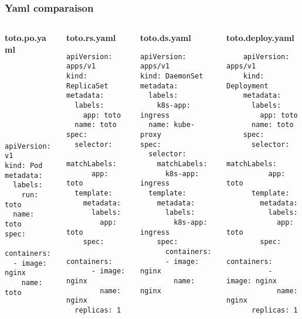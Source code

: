 \subsubsection{Yaml comparaison}
\begin{frame}[fragile]{\subsubsecname}

\begin{small}
\begin{columns}
  \begin{column}{0.20\linewidth}
    \textbf{toto.po.yaml}
    \begin{lstlisting}








apiVersion: v1
kind: Pod
metadata:
  labels:
    run: toto
  name: toto
spec:
  containers:
  - image: nginx
    name: toto
    \end{lstlisting}
  \end{column}
  \begin{column}{0.27\linewidth}
    \textbf{toto.rs.yaml}
    \begin{lstlisting}
apiVersion: apps/v1
kind: ReplicaSet
metadata:
  labels:
    app: toto
  name: toto
spec:
  selector:
    matchLabels:
      app: toto
  template:
    metadata:
      labels:
        app: toto
    spec:
      containers:
      - image: nginx
        name: nginx
  replicas: 1
  \end{lstlisting}
  \end{column}
  \begin{column}{0.26\linewidth}
    \textbf{toto.ds.yaml}
    \begin{lstlisting}
apiVersion: apps/v1
kind: DaemonSet
metadata:
  labels:
    k8s-app: ingress
  name: kube-proxy
spec:
  selector:
    matchLabels:
      k8s-app: ingress
  template:
    metadata:
      labels:
        k8s-app: ingress
    spec:
      containers:
      - image: nginx
        name: nginx
    \end{lstlisting}
  \end{column}
  \begin{column}{0.27\linewidth}
    \textbf{toto.deploy.yaml}
    \begin{lstlisting}
    apiVersion: apps/v1
    kind: Deployment
    metadata:
      labels:
        app: toto
      name: toto
    spec:
      selector:
        matchLabels:
          app: toto
      template:
        metadata:
          labels:
            app: toto
        spec:
          containers:
          - image: nginx
            name: nginx
      replicas: 1
    \end{lstlisting}
  \end{column}
\end{columns}
\end{small}
\end{frame}
